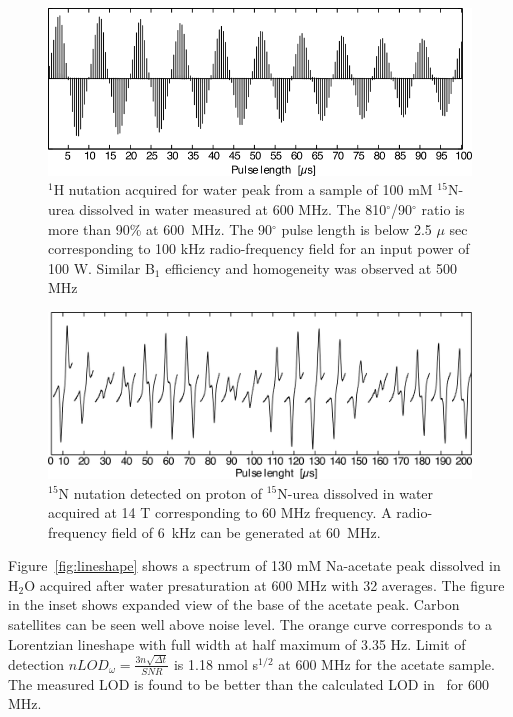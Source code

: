 \documentclass[preprint,12pt]{article}
\begin{document}
\begin{figure}
\centering
\includegraphics[width=.7\linewidth,keepaspectratio=true]{./figures/ms5n17-tlp-sp-150218-1-Hnutation-171216-103.png} 
\caption{$^1$H nutation acquired for water peak from a sample of 100 mM $^{15}$N-urea dissolved in water measured at 600 MHz. The 810$^{\circ}$/90$^{\circ}$ ratio is more than 90\% at 600~MHz. The 90$^{\circ}$ pulse length is below 2.5 $\mu$ sec corresponding to 100 kHz radio-frequency field for an input power of 100 W. Similar B$_{1}$ efficiency and homogeneity was observed at 500 MHz}
\label{fig:1H-nutation} 
\end{figure}
\begin{figure}
\centering
\includegraphics[width=.7\linewidth,keepaspectratio=true]{./figures/ms5n17-tlp-sp-150218-15-Nnutation-171215-003.png} 
\caption{$^{15}$N nutation detected on proton of $^{15}$N-urea dissolved in water acquired at 14 T corresponding to 60 MHz frequency. A radio-frequency field of 6~kHz can be generated at 60~MHz.}
\label{fig:15N-nutation} 
\end{figure}
Figure~\ref{fig:lineshape} shows a spectrum of 130 mM Na-acetate peak dissolved in H$_2$O acquired after water presaturation at 600 MHz with 32 averages. The figure in the inset shows expanded view of the base of the acetate peak. Carbon satellites can be seen well above noise level. The orange curve corresponds to a Lorentzian lineshape with full width at half maximum of 3.35 Hz. Limit of detection $nLOD_{\omega}=\frac{3n\sqrt{{\Delta}t}}{SNR}$ is  1.18 nmol s$^{1/2}$ at 600 MHz for the acetate sample. The measured LOD is found to be better than the calculated LOD in~\cite{gream_2016} for 600 MHz.\par
\end{document}

